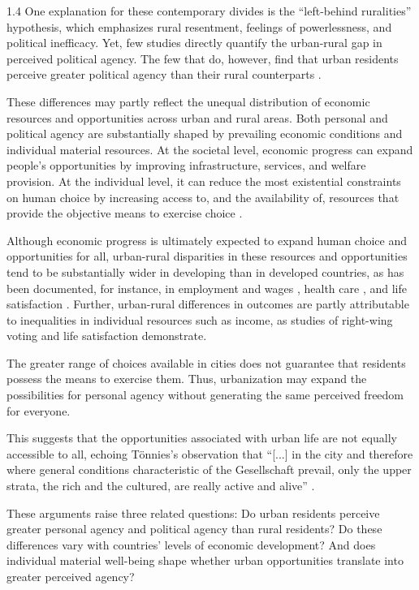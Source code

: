 \documentclass[10pt, letterpaper]{article}
\begin{document}
\begin{spacing}{1.4}
 One explanation for these contemporary divides is the ``left-behind ruralities''
 hypothesis, which emphasizes rural resentment, feelings of powerlessness, and
 political inefficacy. Yet, few studies directly quantify the urban-rural gap in
 perceived political agency. 
 The few that do, however, find that urban residents perceive greater political agency than their rural counterparts  \citep[e.g.,][]{garcia2024they,luukkonen2022urbanisation,rowland2024political}.

These differences may partly reflect the unequal distribution of economic resources and opportunities across urban and rural areas.
Both personal and political agency are substantially shaped by prevailing economic conditions and individual material resources. At the societal level, economic progress can expand people's opportunities by improving infrastructure, services, and welfare provision. At the individual level, it can reduce the most existential constraints on human choice by increasing access to, and the availability of, resources that provide the objective means to exercise choice \citep{welzelinglehart2001,welzeletal2003}. 

Although economic progress is ultimately expected to expand human choice and opportunities for all, urban-rural disparities in these resources and opportunities tend to be substantially wider in developing than in developed countries, as has been documented, for instance, in employment and wages \citep{ananian2024employment}, health care \citep{marthiasetal2025}, and life satisfaction \citep{easterlinetal2011}. Further, urban-rural differences in outcomes are partly attributable to inequalities in individual resources such as income, as studies of right-wing voting \citep{rickardsson2021} and life satisfaction \citep{easterlinetal2011} demonstrate. 
%

The greater range of choices available in cities does not guarantee that residents possess the means to exercise them. Thus, urbanization may expand the possibilities for personal agency without generating the same perceived freedom for everyone.

This suggests that the opportunities associated with urban life are not equally accessible to all, echoing T\"{o}nnies's observation that ``[...] in the city and therefore where general conditions characteristic of the Gesellschaft prevail, only the upper strata, the rich and the cultured, are really active and alive'' \citep[p. 227]{tonnies57}. 

These arguments raise three related questions: Do urban residents perceive greater personal agency and political agency than rural residents? Do these differences vary with countries' levels of economic development? And does individual material well-being shape whether urban opportunities translate into greater perceived agency? 


\end{spacing}
\end{document}
